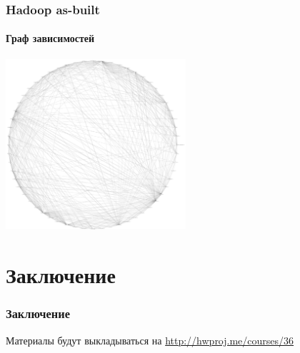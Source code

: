 \documentclass[xetex,mathserif,serif]{beamer}
\begin{document}
	\begin{frame}
		\frametitle{Hadoop as-built}
		\framesubtitle{Граф зависимостей}
		\begin{center}
			\includegraphics[width=0.5\textwidth]{hadoopDependencies.png}
		\end{center}
	\end{frame}

	\section{Заключение}

	\begin{frame}
		\frametitle{Заключение}
		Материалы будут выкладываться на \url{http://hwproj.me/courses/36}
	\end{frame}
\end{document}
